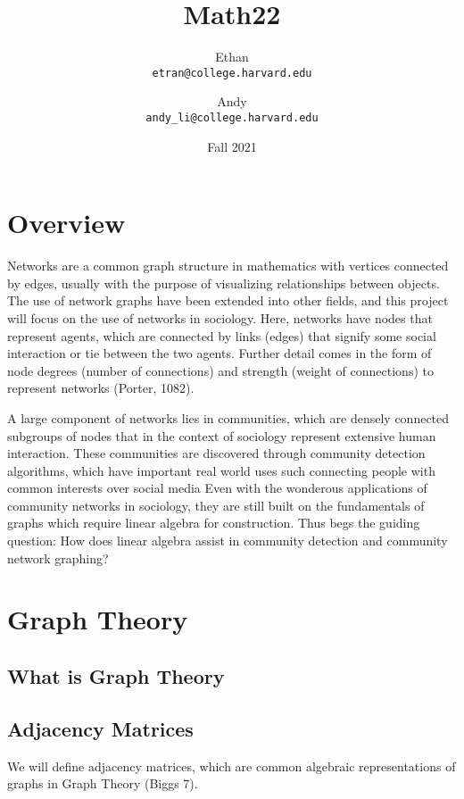 \documentclass{article}
\title{Math22}
\date{Fall 2021}
\author{Ethan \\ \texttt{etran@college.harvard.edu} \and Andy \\ \texttt{andy\_li@college.harvard.edu}}
\begin{document}
\maketitle

\pagebreak

\tableofcontents

\section{Overview}
Networks are a common graph structure in mathematics with vertices connected by edges, usually with the purpose of visualizing relationships between objects.
The use of network graphs have been extended into other fields, and this project will focus on the use of networks in sociology.
Here, networks have nodes that represent agents, which are connected by links (edges) that signify some social interaction or tie between the two agents.
Further detail comes in the form of node degrees (number of connections) and strength (weight of connections) to represent networks (Porter, 1082). 
 
A large component of networks lies in communities, which are densely connected subgroups of nodes that in the context of sociology represent extensive human interaction.
These communities are discovered through community detection algorithms, which have important real world uses such connecting people with common interests over social media
Even with the wonderous applications of community networks in sociology, they are still built on the fundamentals of graphs which require linear algebra for construction. 
Thus begs the guiding question:
How does linear algebra assist in community detection and community network graphing?

\section{Graph Theory}

\subsection{What is Graph Theory}

\subsection{Adjacency Matrices}
We will define adjacency matrices, which are common algebraic representations of graphs in Graph Theory (Biggs 7).
\end{document}
